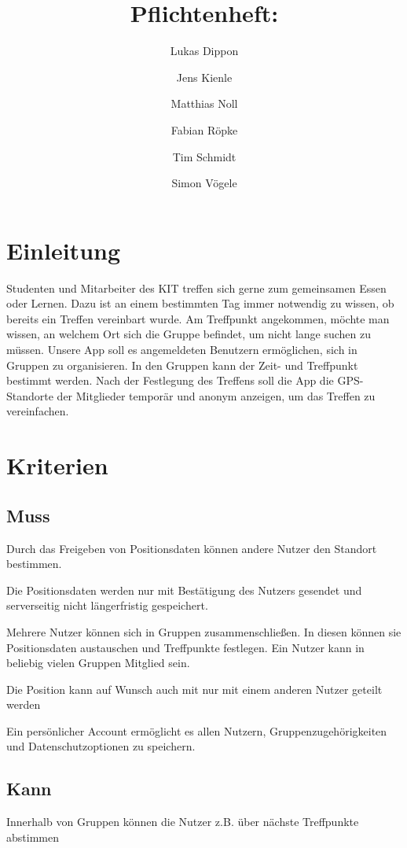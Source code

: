 \documentclass[parskip=full,11pt]{scrartcl}
\title{Pflichtenheft: \producttitle}
\author{Lukas Dippon
        \and Jens Kienle
        \and Matthias Noll
        \and Fabian Röpke
        \and Tim Schmidt
        \and Simon Vögele}
\begin{document}
\maketitle

\section{Einleitung}
Studenten und Mitarbeiter des KIT treffen sich gerne zum gemeinsamen Essen oder Lernen.
Dazu ist an einem bestimmten Tag immer notwendig zu wissen, ob bereits ein Treffen vereinbart wurde.
Am Treffpunkt angekommen, möchte man wissen, an welchem Ort sich die Gruppe befindet, um nicht lange suchen zu müssen.
Unsere App soll es angemeldeten Benutzern ermöglichen, sich in Gruppen zu organisieren.
In den Gruppen kann der Zeit- und Treffpunkt bestimmt werden.
Nach der Festlegung des Treffens soll die App die GPS-Standorte der Mitglieder temporär und anonym anzeigen, um das Treffen zu vereinfachen.

\pagebreak
\section{Kriterien}

\subsection{Muss}
Durch das Freigeben von Positionsdaten können andere Nutzer den
Standort bestimmen.

Die Positionsdaten werden nur mit Bestätigung
des Nutzers gesendet und serverseitig nicht längerfristig gespeichert.

Mehrere Nutzer können sich in Gruppen zusammenschließen. In diesen
können sie Positionsdaten austauschen und Treffpunkte festlegen.
Ein Nutzer kann in beliebig vielen Gruppen Mitglied sein.

Die Position kann auf Wunsch auch mit nur mit einem anderen Nutzer geteilt werden

Ein persönlicher Account ermöglicht es allen Nutzern,
Gruppenzugehörigkeiten und Datenschutzoptionen zu speichern.

\subsection{Kann}
Innerhalb von Gruppen können die Nutzer z.B. über nächste Treffpunkte abstimmen
\end{document}
